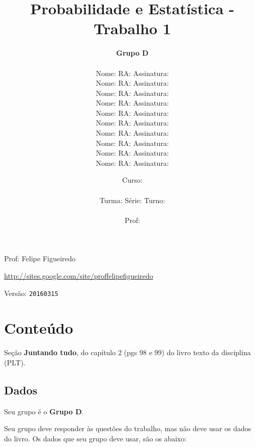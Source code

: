 \documentclass[a4paper]{article}
\date{
\bigskip
Curso: \underline{\hspace{8cm}}\\
\ \\
Turma: \underline{\hspace{1cm}} Série: \underline{\hspace{1cm}} Turno:
\underline{\hspace{1cm}}\\
\ \\
Prof: \underline{\hspace{8cm}}\\
}
\title{Probabilidade e Estatística - Trabalho 1}
\author{
{\bf Grupo D}\\
\ \\
Nome: \underline{\hspace{6cm}} RA: \underline{\hspace{2cm}} Assinatura: \underline{\hspace{4cm}}\\
Nome: \underline{\hspace{6cm}} RA: \underline{\hspace{2cm}} Assinatura: \underline{\hspace{4cm}}\\
Nome: \underline{\hspace{6cm}} RA: \underline{\hspace{2cm}} Assinatura: \underline{\hspace{4cm}}\\
Nome: \underline{\hspace{6cm}} RA: \underline{\hspace{2cm}} Assinatura: \underline{\hspace{4cm}}\\
Nome: \underline{\hspace{6cm}} RA: \underline{\hspace{2cm}} Assinatura: \underline{\hspace{4cm}}\\
Nome: \underline{\hspace{6cm}} RA: \underline{\hspace{2cm}} Assinatura: \underline{\hspace{4cm}}\\
Nome: \underline{\hspace{6cm}} RA: \underline{\hspace{2cm}} Assinatura: \underline{\hspace{4cm}}\\
Nome: \underline{\hspace{6cm}} RA: \underline{\hspace{2cm}} Assinatura: \underline{\hspace{4cm}}\\
Nome: \underline{\hspace{6cm}} RA: \underline{\hspace{2cm}} Assinatura: \underline{\hspace{4cm}}\\
Nome: \underline{\hspace{6cm}} RA: \underline{\hspace{2cm}} Assinatura: \underline{\hspace{4cm}}\\
}
\begin{document}
\maketitle
\newpage

\parbox[c]{.825\textwidth}{\raggedright%
{Prof: Felipe Figueiredo\par}
{\url{http://sites.google.com/site/proffelipefigueiredo}\par}
}

Versão: \verb|20160315|




\section{Conteúdo}

Seção {\bf Juntando tudo}, do capítulo 2 (pgs 98 e 99) do livro texto da disciplina (PLT). 

\subsection{Dados}
Seu grupo é o {\bf Grupo D}.

Seu grupo deve responder às questões do trabalho, mas não deve usar os dados do livro. Os dados que seu grupo deve usar, são os abaixo:
\end{document}
